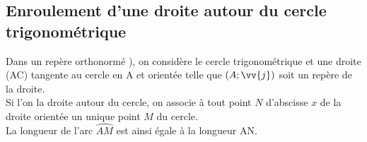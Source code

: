     \subsection{Enroulement d'une droite autour du cercle trigonométrique}
    
    \begin{minipage}{0.65\linewidth}
        Dans un repère orthonormé \Rij), on considère le cercle trigonométrique et une droite (AC) tangente au cercle en A et orientée telle que $(A ; \vv{j})$ soit un repère de la droite.\\
        Si l'on  la droite autour du cercle, on associe à tout point $N$ d'abscisse $x$ de la droite orientée un unique point $M$ du cercle.\\
        La longueur de l'arc $\wideparen{AM}$ est ainsi égale à la longueur AN.
    \end{minipage} \hfill
